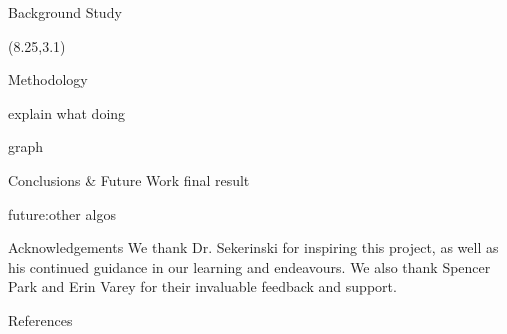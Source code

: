 \documentclass[22pt]{beamer}
\begin{document}
\begin{frame}[fragile]
\begin{textblock}{7.25}
\begin{block}{Background Study}
\end{block}
\end{textblock}


\begin{textblock}{7.25}(8.25,3.1)
\begin{block}{Methodology}

explain what doing

graph

\end{block}


\begin{block}{Conclusions \& Future Work}
final result

future:other algos
\end{block}


\begin{block}{Acknowledgements}
We thank Dr. Sekerinski for inspiring this project, as well as his continued guidance in our learning and endeavours. We also thank Spencer Park and Erin Varey for their invaluable feedback and support. 
\end{block}

\begin{block}{References}

{\scriptsize
}
\end{block}

\end{textblock}

%
%

\end{frame}
\end{document}
